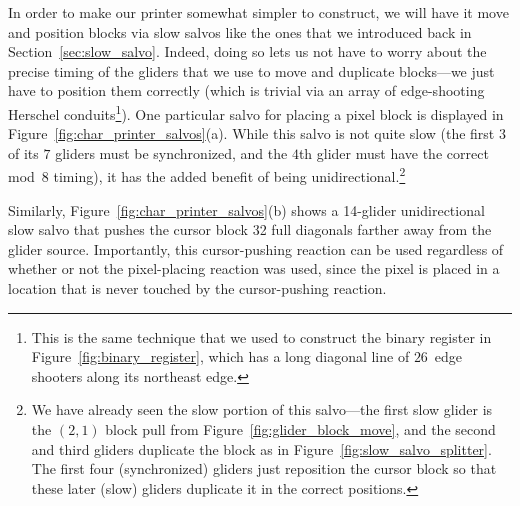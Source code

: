 In order to make our printer somewhat simpler to construct, we will have it move and position blocks via slow salvos like the ones that we introduced back in Section~\ref{sec:slow_salvo}. Indeed, doing so lets us not have to worry about the precise timing of the gliders that we use to move and duplicate blocks---we just have to position them correctly (which is trivial via an array of edge-shooting Herschel conduits\footnote{This is the same technique that we used to construct the binary register in Figure~\ref{fig:binary_register}, which has a long diagonal line of $26$~edge shooters along its northeast edge.}). One particular salvo for placing a pixel block is displayed in Figure~\ref{fig:char_printer_salvos}(a). While this salvo is not quite slow (the first $3$ of its $7$ gliders must be synchronized, and the $4$th glider must have the correct mod~$8$ timing), it has the added benefit of being unidirectional.\footnote{We have already seen the slow portion of this salvo---the first slow glider is the $(2,1)$ block pull from Figure~\ref{fig:glider_block_move}, and the second and third gliders duplicate the block as in Figure~\ref{fig:slow_salvo_splitter}. The first four (synchronized) gliders just reposition the cursor block so that these later (slow) gliders duplicate it in the correct positions.}

Similarly, Figure~\ref{fig:char_printer_salvos}(b) shows a 14-glider unidirectional slow salvo that pushes the cursor block 32 full diagonals farther away from the glider source. Importantly, this cursor-pushing reaction can be used regardless of whether or not the pixel-placing reaction was used, since the pixel is placed in a location that is never touched by the cursor-pushing reaction.

